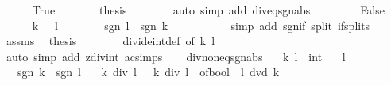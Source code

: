 \begin{isabellebody}
\ \ \ \ \isamarkupfalse%
\ True\isanewline
\ \ \ \ \isamarkupfalse%
\ \isamarkupfalse%
\ {\isacharquery}{\kern0pt}thesis\isanewline
\ \ \ \ \ \ \isamarkupfalse%
\ {\isacharparenleft}{\kern0pt}auto\ simp\ add{\isacharcolon}{\kern0pt}\ div{\isacharunderscore}{\kern0pt}eq{\isacharunderscore}{\kern0pt}sgn{\isacharunderscore}{\kern0pt}abs{\isacharparenright}{\kern0pt}\isanewline
\ \ \isamarkupfalse%
\isanewline
\ \ \ \ \isamarkupfalse%
\ False\isanewline
\ \ \ \ \isamarkupfalse%
\ {\isacartoucheopen}k\ {\isasymnoteq}\ {}{\isacartoucheclose}\ {\isacartoucheopen}l\ {\isasymnoteq}\ {}{\isacartoucheclose}\isanewline
\ \ \ \ \isamarkupfalse%
\ {\isachardoublequoteopen}sgn\ l\ {\isacharasterisk}{\kern0pt}\ sgn\ k\ {\isacharequal}{\kern0pt}\ {\isacharminus}{\kern0pt}\ {}{\isachardoublequoteclose}\isanewline
\ \ \ \ \ \ \isamarkupfalse%
\ {\isacharparenleft}{\kern0pt}simp\ add{\isacharcolon}{\kern0pt}\ sgn{\isacharunderscore}{\kern0pt}if\ split{\isacharcolon}{\kern0pt}\ if{\isacharunderscore}{\kern0pt}splits{\isacharparenright}{\kern0pt}\isanewline
\ \ \ \ \isamarkupfalse%
\ assms\ \isamarkupfalse%
\ {\isacharquery}{\kern0pt}thesis\isanewline
\ \ \ \ \ \ \isamarkupfalse%
\ divide{\isacharunderscore}{\kern0pt}int{\isacharunderscore}{\kern0pt}def\ {\isacharbrackleft}{\kern0pt}of\ k\ l{\isacharbrackright}{\kern0pt}\isanewline
\ \ \ \ \ \ \isamarkupfalse%
\ {\isacharparenleft}{\kern0pt}auto\ simp\ add{\isacharcolon}{\kern0pt}\ zdiv{\isacharunderscore}{\kern0pt}int\ ac{\isacharunderscore}{\kern0pt}simps{\isacharparenright}{\kern0pt}\isanewline
\ \ \isamarkupfalse%
\isanewline
{}\isamarkupfalse%
%
\endisatagproof
{\isafoldproof}%
%
\isadelimproof
\isanewline
%
\endisadelimproof
\isanewline
{}\isamarkupfalse%
\ div{\isacharunderscore}{\kern0pt}noneq{\isacharunderscore}{\kern0pt}sgn{\isacharunderscore}{\kern0pt}abs{\isacharcolon}{\kern0pt}\isanewline
\ \ \ k\ l\ {\isacharcolon}{\kern0pt}{\isacharcolon}{\kern0pt}\ int\isanewline
\ \ \ {\isachardoublequoteopen}l\ {\isasymnoteq}\ {}{\isachardoublequoteclose}\isanewline
\ \ \ {\isachardoublequoteopen}sgn\ k\ {\isasymnoteq}\ sgn\ l{\isachardoublequoteclose}\isanewline
\ \ \ {\isachardoublequoteopen}k\ div\ l\ {\isacharequal}{\kern0pt}\ {\isacharminus}{\kern0pt}\ {\isacharparenleft}{\kern0pt}{\isasymbar}k{\isasymbar}\ div\ {\isasymbar}l{\isasymbar}{\isacharparenright}{\kern0pt}\ {\isacharminus}{\kern0pt}\ of{\isacharunderscore}{\kern0pt}bool\ {\isacharparenleft}{\kern0pt}{\isasymnot}\ l\ dvd\ k{\isacharparenright}{\kern0pt}{\isachardoublequoteclose}\isanewline

\end{isabellebody}
